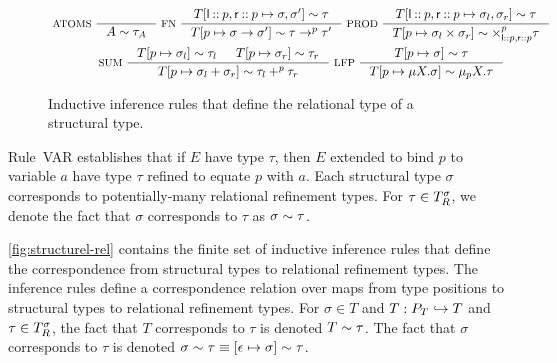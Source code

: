 \begin{figure}
  \centering
  \begin{gather*}
    \inference[ ATOMS ]{ }{ %
      A \reltyof \tau_A } 
    \inference[ FN ]{ 
      \upd{ T }{ \leftchild \cons p, \rightchild \cons p }{ \sigma, \sigma' } %
      \reltyof \tau }{
      \upd{ T }{ p }{ \sigma \to \sigma' } \reltyof \tau \to^p \tau' } 
    \inference[ PROD ]{
      \upd{ T }{ \leftchild \cons p, \rightchild \cons p }{ %
        \sigma_l, \sigma_r } \reltyof \tau }{
      \upd{ T }{ p }{ \sigma_l \times \sigma_r } \reltyof %
      \times_{ \leftchild \cons p, \rightchild \cons p }^{p} \tau } \\
    \inference[ SUM ]{
      \upd{ T }{ p }{ \sigma_l } \reltyof \tau_l &
      \upd{ T }{ p }{ \sigma_r } \reltyof \tau_r }{
      \upd{ T }{ p }{ \sigma_l + \sigma_r } \reltyof \tau_l +^p \tau_r } 
    \inference[ LFP ]{
      \upd{ T }{ p }{ \sigma } \reltyof \tau }{
      \upd{ T }{ p }{ \mu X. \sigma } \reltyof \mu_p X. \tau }
  \end{gather*}
  \caption{Inductive inference rules that define the relational type
    of a structural type.
     }
  \label{fig:structure-rel}
\end{figure}

Rule~VAR establishes that if $E$ have type $\tau$, then $E$ extended
to bind $p$ to variable $a$ have type $\tau$ refined to equate $p$
with $a$.
Each structural type $\sigma$ corresponds to potentially-many
relational refinement types.
%
For $\tau \in T_{R}^{\sigma}$, we denote the fact that $\sigma$
corresponds to $\tau$ as $\sigma \sim \tau$.

\autoref{fig:structurel-rel} contains the finite set of inductive
inference rules that define the correspondence from structural types
to relational refinement types.
%
The inference rules define a correspondence relation over maps from
type positions to structural types to relational refinement types.
%
For $\sigma \in T$ and $T: P_T \hookrightarrow T$ and
$\tau \in T_{R}^{ \sigma }$, the fact that $T$ corresponds to
$\tau$ is denoted $T \sim \tau$.
%
The fact that $\sigma$ corresponds to $\tau$ is denoted
$\sigma \sim \tau \equiv [ \epsilon \mapsto \sigma ] \sim
\tau$.

